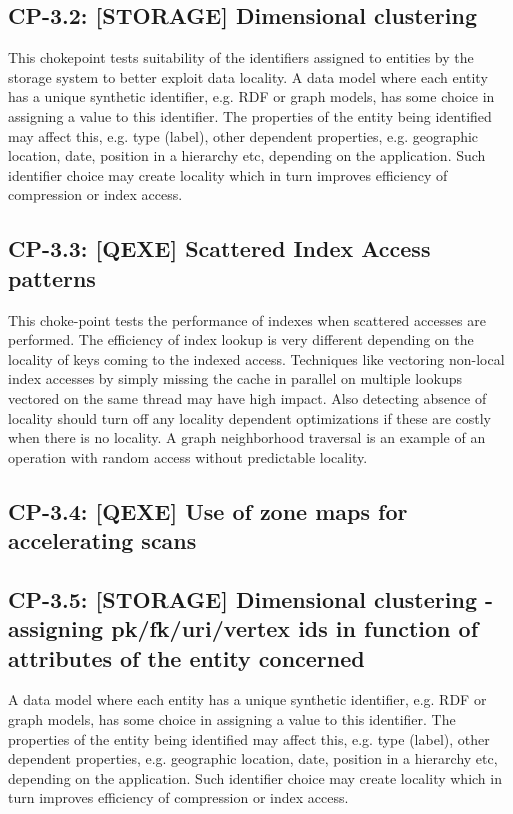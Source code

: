\subsection*{CP-3.2: [STORAGE] Dimensional clustering}
\label{choke_point_3.2}
This chokepoint tests suitability of the identifiers assigned to entities by the storage system to better exploit data locality. A data model where each entity has a unique synthetic identifier,
e.g. RDF or graph models, has some choice in assigning a value to this identifier. The properties of the entity being identified may affect this, e.g. type (label), other dependent properties,
e.g. geographic location, date, position in a hierarchy etc, depending on the application. Such identifier choice may create locality which in turn improves efficiency of compression or index access.



\subsection*{CP-3.3: [QEXE] Scattered Index Access patterns}
\label{choke_point_3.3}
This choke-point tests the performance of indexes when scattered accesses are performed. The efficiency of index lookup is very different depending on the locality of keys coming to the indexed access.
Techniques like vectoring non-local index accesses by simply missing the cache in parallel on multiple lookups vectored on the same thread may have high impact.
Also detecting absence of locality should turn off any locality dependent optimizations if these are costly when there is no locality. A graph neighborhood traversal is an example of an operation with random access without predictable locality.

%

\subsection*{CP-3.4: [QEXE] Use of zone maps for accelerating scans}
\label{choke_point_3.4}
%

\subsection*{CP-3.5: [STORAGE] Dimensional clustering - assigning pk/fk/uri/vertex ids in function of attributes of the entity concerned}
\label{choke_point_3.5}
A data model where each entity has a unique synthetic identifier, e.g. RDF or graph models, has some choice in assigning a value to this identifier. The properties of the entity being identified may affect this, e.g. type (label), other dependent properties, e.g. geographic location, date, position in a hierarchy etc, depending on the application. Such identifier choice may create locality which in turn improves efficiency of compression or index access.

